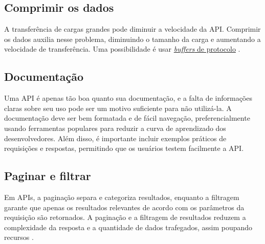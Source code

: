 \subsection{Comprimir os dados}
A transferência de cargas grandes pode diminuir a velocidade da API. Comprimir os dados auxilia nesse problema, diminuindo o tamanho da carga e aumentando a velocidade de transferência. Uma possibilidade é usar \hyperref[subsecao-trocas-de-dados]{\emph{buffers} de protocolo} \cite{api-design-restfulapi}.

\subsection{Documentação}
Uma API é apenas tão boa quanto sua documentação, e a falta de informações claras sobre seu uso pode ser um motivo suficiente para não utilizá-la. A documentação deve ser bem formatada e de fácil navegação, preferencialmente usando ferramentas populares para reduzir a curva de aprendizado dos desenvolvedores. Além disso, é importante incluir exemplos práticos de requisições e respostas, permitindo que os usuários testem facilmente a API. \cite{api-design-restfulapi}



\subsection{Paginar e filtrar}
Em APIs, a paginação separa e categoriza resultados, enquanto a filtragem garante que apenas os resultados relevantes de acordo com os parâmetros da requisição são retornados. A paginação e a filtragem de resultados reduzem a complexidade da resposta e a quantidade de dados trafegados, assim poupando recursos \cite{api-design-restfulapi}.


